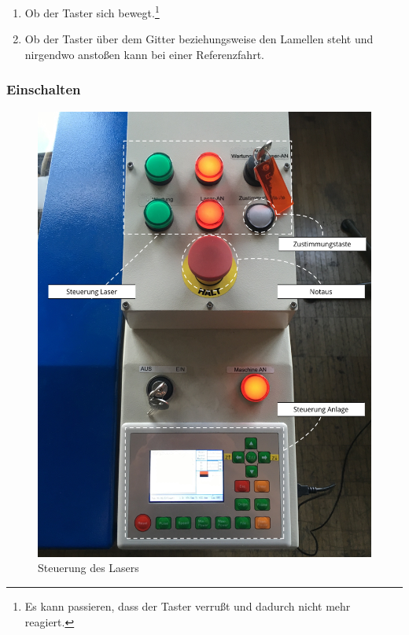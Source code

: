 \documentclass[]{article}
\providecommand{\tightlist}{%
  \setlength{\itemsep}{0pt}\setlength{\parskip}{0pt}}
\begin{document}
\begin{enumerate}
\def\labelenumi{\arabic{enumi}.}
\tightlist
\item
  Ob der Taster sich bewegt.\footnote{Es kann passieren, dass der Taster
    verrußt und dadurch nicht mehr reagiert.}
\item
  Ob der Taster über dem Gitter beziehungsweise den Lamellen steht und
  nirgendwo anstoßen kann bei einer Referenzfahrt.
\end{enumerate}

\hypertarget{einschalten}{%
\subsubsection{Einschalten}\label{einschalten}}

\begin{figure}
\hypertarget{fig:steuerung}{%
\centering
\includegraphics{assets/images/laser-control-panel.png}
\caption{Steuerung des Lasers}\label{fig:steuerung}
}
\end{figure}
\end{document}
